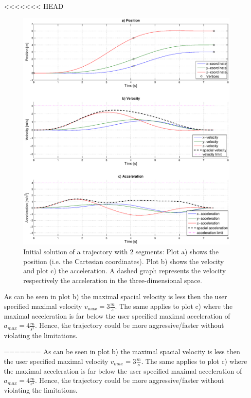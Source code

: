 <<<<<<< HEAD
\begin{figure}[h]
   \centering
   \includegraphics[trim = 35mm 30mm 30mm 15mm,clip,width=1\textwidth]{pics/2SegInit7s43.eps}
   \caption{Initial solution of a trajectory with 2 segments: Plot a) shows the position (i.e. the Cartesian coordinates). Plot b) shows the velocity and plot c) the acceleration. A dashed graph represents the velocity respectively the acceleration in the three-dimensional space.}
   \label{pic:initialSolution}
\end{figure}

As can be seen in plot b) the maximal spacial velocity is less then the user specified maximal velocity $v_{max} = 3\frac{m}{s}$. The same applies to plot c) where the maximal acceleration is far below the user specified maximal acceleration of $a_{max} = 4 \frac{m}{s^2}$. Hence, the trajectory could be more aggressive/faster without violating the limitations. \newline

=======
As can be seen in plot b) the maximal spacial velocity is less then the user specified maximal velocity $v_{max} = 3\frac{m}{s}$. The same applies to plot c) where the maximal acceleration is far below the user specified maximal acceleration of $a_{max} = 4 \frac{m}{s^2}$. Hence, the trajectory could be more aggressive/faster without violating the limitations. \newline


